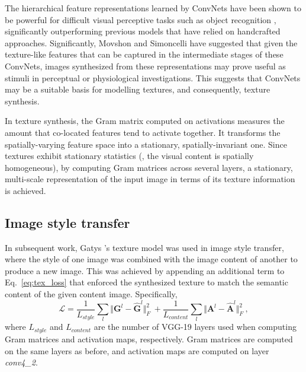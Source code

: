 The hierarchical feature representations learned by ConvNets have been shown to be powerful for difficult visual perceptive tasks such as object recognition \cite{krizhevsky2012,simonyan2014very}, significantly outperforming previous models that have relied on handcrafted approaches. Significantly, Movshon and Simoncelli \cite{movshon2014} have suggested that given the texture-like features that can be captured in the intermediate stages of these ConvNets, images synthesized from these representations may prove useful as stimuli in perceptual or physiological investigations. This suggests that ConvNets may be a suitable basis for modelling textures, and consequently, texture synthesis.

In texture synthesis, the Gram matrix computed on activations measures the amount that co-located features tend to activate together. It transforms the spatially-varying feature space into a stationary, spatially-invariant one. Since textures exhibit stationary statistics (\ie, the visual content is spatially homogeneous), by computing Gram matrices across several layers, a stationary, multi-scale representation of the input image in terms of its texture information is achieved.

\subsection{Image style transfer}

In subsequent work, Gatys \etal's \cite{gatys2016image} texture model was used in image style
transfer, where the style of one image was
combined with the image content of another to produce a new image.
This was achieved by appending an additional term to Eq.\ \ref{eq:tex_loss}
that enforced the synthesized texture to match the semantic content of the given content image. Specifically,
\begin{equation}
   \mathcal{L} = \frac{1}{L_{style}} \sum_{l} \Vert \mathbf{G}^l - \hat{\mathbf{G}}^l \Vert^2_F\ + \frac{1}{L_{content}} \sum_{l} \Vert \mathbf{A}^l - \hat{\mathbf{A}}^l \Vert^2_F\ ,
   \label{eq:styletransfer_loss}
\end{equation}
where $L_{style}$ and $L_{content}$ are the number of VGG-19 layers used when computing Gram matrices and activation maps, respectively. Gram matrices are computed on the same layers as before, and activation maps are computed on layer \emph{conv4\_2}.

